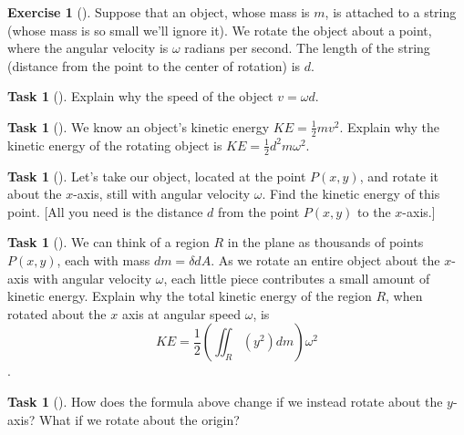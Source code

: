 \documentclass[10pt,]{book}
\theoremstyle{plain}
\theoremstyle{definition}
\theoremstyle{definition}
\theoremstyle{definition}
\theoremstyle{definition}
\newtheorem{exploration}[project]{Exercise}
\newtheorem{task}[project]{Task}
\theoremstyle{definition}
\numberwithin{equation}{section}
\begin{document}
\begin{exploration}[]\label{exploration-254}
Suppose that an object, whose mass is \(m\), is attached to a string (whose mass is so small we'll ignore it). We rotate the object about a point, where the angular velocity is \(\omega\) radians per second. The length of the string (distance from the point to the center of rotation) is \(d\).%
\begin{task}[]\label{task-690}
Explain why the speed of the object \(v=\omega d\).%
\end{task}
\begin{task}[]\label{task-691}
We know an object's kinetic energy \(KE=\frac{1}{2}mv^2\). Explain why the kinetic energy of the rotating object is \(KE = \frac{1}{2}d^2m\omega^2\).%
\end{task}
\begin{task}[]\label{task-692}
Let's take our object, located at the point \(P(x,y)\), and rotate it about the \(x\)-axis, still with angular velocity \(\omega\). Find the kinetic energy of this point. [All you need is the distance \(d\) from the point \(P(x,y)\) to the \(x\)-axis.]%
\end{task}
\begin{task}[]\label{task-693}
We can think of a region \(R\) in the plane as thousands of points \(P(x,y)\), each with mass \(dm=\delta dA\). As we rotate an entire object about the \(x\)-axis with angular velocity \(\omega\), each little piece contributes a small amount of kinetic energy. Explain why the total kinetic energy of the region \(R\), when rotated about the \(x\) axis at angular speed \(\omega\), is %
\begin{equation*}
KE= \frac{1}{2}\left(\iint_R (y^2)dm\right)\omega^2
\end{equation*}
.%
\end{task}
\begin{task}[]\label{task-694}
How does the formula above change if we instead rotate about the \(y\)-axis? What if we rotate about the origin? %
\end{task}
\end{exploration}
\end{document}
